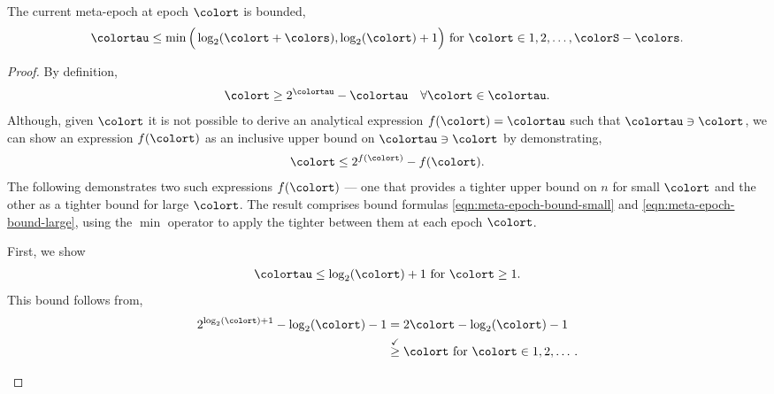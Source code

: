 \begin{lemma}
\label{thm:meta-epoch-bound}
The current meta-epoch at epoch $\colort$ is bounded,
\begin{align*}
\colortau \leq
\min\Big(
  \log_2(\colort + \colors),
  \log_2(\colort) + 1
\Big)
\text{ for } \colort \in 1, 2, \ldots, \colorS - \colors.
\end{align*}
\end{lemma}
\begin{proof}

By definition,
\begin{align*}
\colort \geq 2^{\colortau} - \colortau \quad \forall \colort \in \colortau.
\end{align*}
Although, given $\colort$ it is not possible to derive an analytical expression $f(\colort) = \colortau$ such that $\colortau \ni \colort$, we can show an expression $f(\colort)$ as an inclusive upper bound on $\colortau \ni \colort$ by demonstrating,
\begin{align*}
\colort \leq 2^{f(\colort)} - f(\colort).
\end{align*}
The following demonstrates two such expressions $f(\colort)$ --- one that provides a tighter upper bound on $n$ for small $\colort$ and the other as a tighter bound for large $\colort$.
The result comprises bound formulas \ref{eqn:meta-epoch-bound-small} and \ref{eqn:meta-epoch-bound-large}, using the $\min$ operator to apply the tighter between them at each epoch $\colort$.

\begin{proofpart}
First, we show
\begin{align}
\colortau \leq \log_2(\colort) + 1 \text{ for } \colort \geq 1.
\label{eqn:meta-epoch-bound-small}
\end{align}
This bound follows from,
\begin{align*}
2^{\log_{2}(\colort) + 1} - \log_2(\colort) - 1
&= 2\colort - \log_2(\colort) - 1 \\
&\stackrel{\checkmark}{\geq} \colort \text{ for } \colort \in 1, 2, \ldots \, .
\end{align*}
\end{proofpart}


\end{proof}
